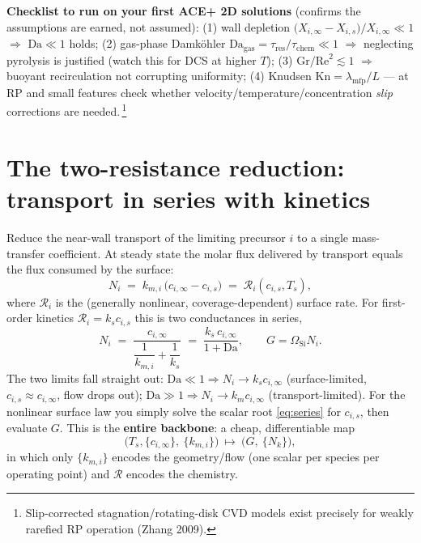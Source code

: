 \documentclass[11pt]{article}
\newcommand{\R}{\mathcal{R}}
\newcommand{\Da}{\mathrm{Da}}
\newcommand{\Rey}{\mathrm{Re}}
\newcommand{\Kn}{\mathrm{Kn}}
\newcommand{\Gr}{\mathrm{Gr}}
\begin{document}
\begin{keybox}
\textbf{Checklist to run on your first ACE+ 2D solutions} (confirms the assumptions are earned, not assumed):
(1) wall depletion $\big(X_{i,\infty}-X_{i,s}\big)/X_{i,\infty}\ll 1$ $\Rightarrow$ $\Da\ll 1$ holds;
(2) gas-phase Damk\"ohler $\Da_{\text{gas}}=\tau_{\text{res}}/\tau_{\text{chem}}\ll 1$ $\Rightarrow$ neglecting  pyrolysis is justified (watch this for DCS at higher $T$);
(3) $\Gr/\Rey^2\lesssim 1$ $\Rightarrow$ buoyant recirculation not corrupting uniformity;
(4) Knudsen $\Kn=\lambda_{\text{mfp}}/L$ --- at RP and small features check whether velocity/temperature/concentration \emph{slip} corrections are needed.\,\footnote{Slip-corrected stagnation/rotating-disk CVD models exist precisely for weakly rarefied RP operation (Zhang 2009).}
\end{keybox}

\section{The two-resistance reduction: transport in series with kinetics}
\label{sec:tworesist}

Reduce the near-wall transport of the limiting precursor $i$ to a single mass-transfer coefficient. At steady state the molar flux delivered by transport equals the flux consumed by the surface:
\begin{equation}
N_i \;=\; k_{m,i}\,\big(c_{i,\infty}-c_{i,s}\big) \;=\; \R_i\!\left(c_{i,s},T_s\right),
\label{eq:series}
\end{equation}
where $\R_i$ is the (generally nonlinear, coverage-dependent) surface rate. For first-order kinetics $\R_i=k_s c_{i,s}$ this is two conductances in series,
\begin{equation}
N_i \;=\; \frac{c_{i,\infty}}{\dfrac{1}{k_{m,i}}+\dfrac{1}{k_s}} \;=\; \frac{k_s\,c_{i,\infty}}{1+\Da},
\qquad
G=\Omega_{\mathrm{Si}}N_i .
\label{eq:tworesistlinear}
\end{equation}
The two limits fall straight out: $\Da\!\ll\!1\Rightarrow N_i\to k_s c_{i,\infty}$ (surface-limited, $c_{i,s}\!\approx\!c_{i,\infty}$, flow drops out); $\Da\!\gg\!1\Rightarrow N_i\to k_m c_{i,\infty}$ (transport-limited). For the nonlinear surface law you simply solve the scalar root \eqref{eq:series} for $c_{i,s}$, then evaluate $G$. This is the \textbf{entire backbone}: a cheap, differentiable map
\begin{equation}
\big(T_s,\{c_{i,\infty}\},\ \{k_{m,i}\}\big)\ \longmapsto\ \big(G,\ \{N_k\}\big),
\end{equation}
in which only $\{k_{m,i}\}$ encodes the geometry/flow (one scalar per species per operating point) and $\R$ encodes the chemistry.
\end{document}

